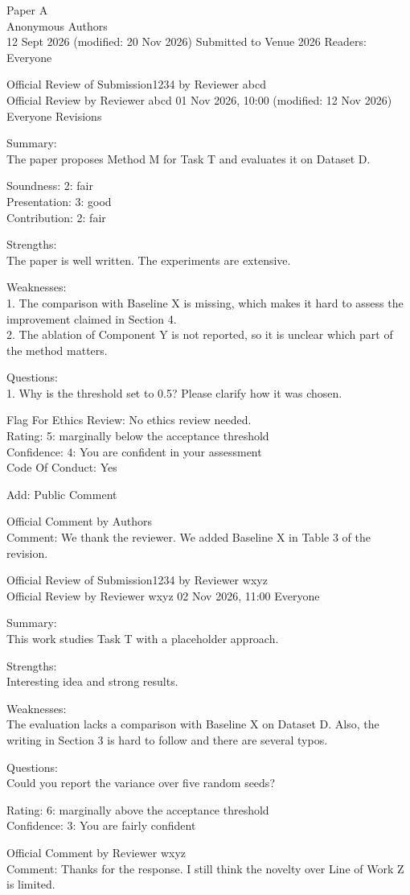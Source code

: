 \documentclass[10pt]{article}
\begin{document}
{\Large Paper A}\\
Anonymous Authors\\
12 Sept 2026 (modified: 20 Nov 2026) Submitted to Venue 2026 Readers: Everyone

{\large Official Review of Submission1234 by Reviewer abcd}\\
Official Review by Reviewer abcd 01 Nov 2026, 10:00 (modified: 12 Nov 2026) Everyone Revisions

Summary:\\
The paper proposes Method M for Task T and evaluates it on Dataset D.

Soundness: 2: fair\\
Presentation: 3: good\\
Contribution: 2: fair

Strengths:\\
The paper is well written. The experiments are extensive.

Weaknesses:\\
1. The comparison with Baseline X is missing, which makes it hard to assess the improvement claimed in Section 4.\\
2. The ablation of Component Y is not reported, so it is unclear which part of the method matters.

Questions:\\
1. Why is the threshold set to 0.5? Please clarify how it was chosen.

Flag For Ethics Review: No ethics review needed.\\
Rating: 5: marginally below the acceptance threshold\\
Confidence: 4: You are confident in your assessment\\
Code Of Conduct: Yes

Add: Public Comment

{\large Official Comment by Authors}\\
Comment: We thank the reviewer. We added Baseline X in Table 3 of the revision.

\newpage
{\large Official Review of Submission1234 by Reviewer wxyz}\\
Official Review by Reviewer wxyz 02 Nov 2026, 11:00 Everyone

Summary:\\
This work studies Task T with a placeholder approach.

Strengths:\\
Interesting idea and strong results.

Weaknesses:\\
The evaluation lacks a comparison with Baseline X on Dataset D. Also, the writing in Section 3 is hard to follow and there are several typos.

Questions:\\
Could you report the variance over five random seeds?

Rating: 6: marginally above the acceptance threshold\\
Confidence: 3: You are fairly confident

{\large Official Comment by Reviewer wxyz}\\
Comment: Thanks for the response. I still think the novelty over Line of Work Z is limited.
\end{document}
